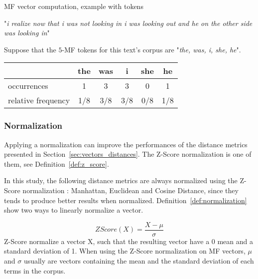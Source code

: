 \begin{example}
  \centering
  \caption{MF vector computation, example with tokens}
  \label{ex:mf_vector}

  \begin{subexample}{\linewidth}
    "\textit{i realize now that i was not looking in i was looking out and he on the other side was looking in}"\cite{ddlc}
  \end{subexample}

  \vspace{0.5cm}

  \begin{subexample}{\linewidth}
    Suppose that the $5$-MF tokens for this text's corpus are "\textit{the, was, i, she, he}".

    \centering
    \begin{tabular}{l c c c c c}
      \toprule
                       & the & was & i   & she & he  \\
      \midrule
      occurrences         & 1   & 3   & 3   & 0   & 1   \\
      relative frequency & 1/8 & 3/8 & 3/8 & 0/8 & 1/8 \\
      \bottomrule
    \end{tabular}
  \end{subexample}
\end{example}

\subsubsection{Normalization}

Applying a normalization can improve the performances of the distance metrics presented in Section~\ref{sec:vectors_distances}.
The Z-Score normalization is one of them, see Definition~\ref{def:z_score}.

In this study, the following distance metrics are always normalized using the Z-Score normalization : Manhattan, Euclidean and Cosine Distance, since they tends to produce better results when normalized.
Definition~\ref{def:normalization} show two ways to linearly normalize a vector.

\begin{definition}
  \label{def:z_score}
  \begin{equation}
    ZScore(X) = \frac{X - \mu}{\sigma}
  \end{equation}
  Z-Score normalize a vector X, such that the resulting vector have a 0 mean and a standard deviation of 1.
  When using the Z-Score normalization on MF vectors, $\mu$ and $\sigma$ usually are vectors containing the mean and the standard deviation of each terms in the corpus.
\end{definition}

